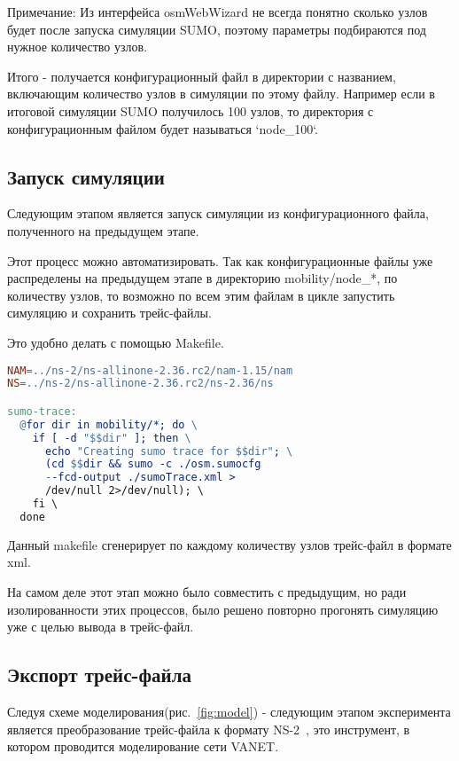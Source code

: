 Примечание: Из интерфейса osmWebWizard не всегда понятно сколько узлов будет после запуска симуляции SUMO, поэтому параметры подбираются под нужное количество узлов.

Итого - получается конфигурационный файл в директории с названием, включающим количество узлов в симуляции по этому файлу. Например если в итоговой симуляции SUMO получилось 100 узлов, то директория с конфигурационным файлом будет называться `node\_100`.

\subsection*{Запуск симуляции}

Следующим этапом является запуск симуляции из конфигурационного файла, полученного на предыдущем этапе. 

Этот процесс можно автоматизировать. Так как конфигурационные файлы уже распределены на предыдущем этапе в директорию mobility/node\_*, по количеству узлов, то возможно по всем этим файлам в цикле запустить симуляцию и сохранить трейс-файлы.

Это удобно делать с помощью Makefile.

\begin{lstlisting}[language=make, style=mystyle, caption=Makefile для запуска симуляции мобильности]
NAM=../ns-2/ns-allinone-2.36.rc2/nam-1.15/nam
NS=../ns-2/ns-allinone-2.36.rc2/ns-2.36/ns

sumo-trace:
  @for dir in mobility/*; do \
    if [ -d "$$dir" ]; then \
      echo "Creating sumo trace for $$dir"; \
      (cd $$dir && sumo -c ./osm.sumocfg  
      --fcd-output ./sumoTrace.xml > 
      /dev/null 2>/dev/null); \
    fi \
  done

\end{lstlisting}

Данный makefile сгенерирует по каждому количеству узлов трейс-файл в формате xml.

На самом деле этот этап можно было совместить с предыдущим, но ради изолированности этих процессов, было решено повторно прогонять симуляцию уже с целью вывода в трейс-файл.

\subsection*{Экспорт трейс-файла}

Следуя схеме моделирования(рис.~\ref{fig:model}) - следующим этапом эксперимента является преобразование трейс-файла к формату NS-2~\cite{ns2_docs}, это инструмент, в котором проводится моделирование сети VANET.

